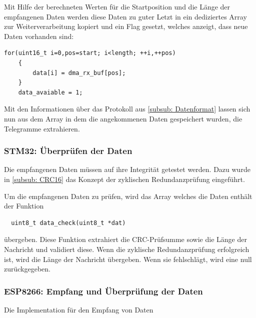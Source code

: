   \smallskip

  Mit Hilfe der berechneten Werten für die Startposition und die Länge der empfangenen Daten werden diese Daten zu guter Letzt in ein dediziertes
  Array zur Weiterverarbeitung kopiert und ein Flag gesetzt, welches anzeigt, dass neue Daten vorhanden sind:
  
  \begin{lstlisting}[caption={\textit{Kopieren neuer Daten}}]
    for(uint16_t i=0,pos=start; i<length; ++i,++pos)
    {
        data[i] = dma_rx_buf[pos];
    }
    data_avaiable = 1;
  \end{lstlisting}

  Mit den Informationen über das Protokoll aus \ref{subsub: Datenformat} lassen sich nun aus dem Array in dem die angekommenen Daten gespeichert wurden, die Telegramme extrahieren.

\subsubsection{STM32: Überprüfen der Daten}

Die empfangenen Daten müssen auf ihre Integrität getestet werden. Dazu wurde in \ref{subsub: CRC16} das Konzept der zyklischen Redundanzprüfung eingeführt.

\smallskip

Um die empfangenen Daten zu prüfen, wird das Array welches die Daten enthält der Funktion 
\begin{lstlisting}
  uint8_t data_check(uint8_t *dat)
\end{lstlisting}
übergeben. Diese Funktion extrahiert die CRC-Prüfsumme sowie die Länge der Nachricht und validiert diese. Wenn die zyklische Redundanzprüfung erfolgreich
ist, wird die Länge der Nachricht übergeben. Wenn sie fehlschlägt, wird eine null zurückgegeben.


\subsubsection{ESP8266: Empfang und Überprüfung der Daten}

Die Implementation für den Empfang von Daten 